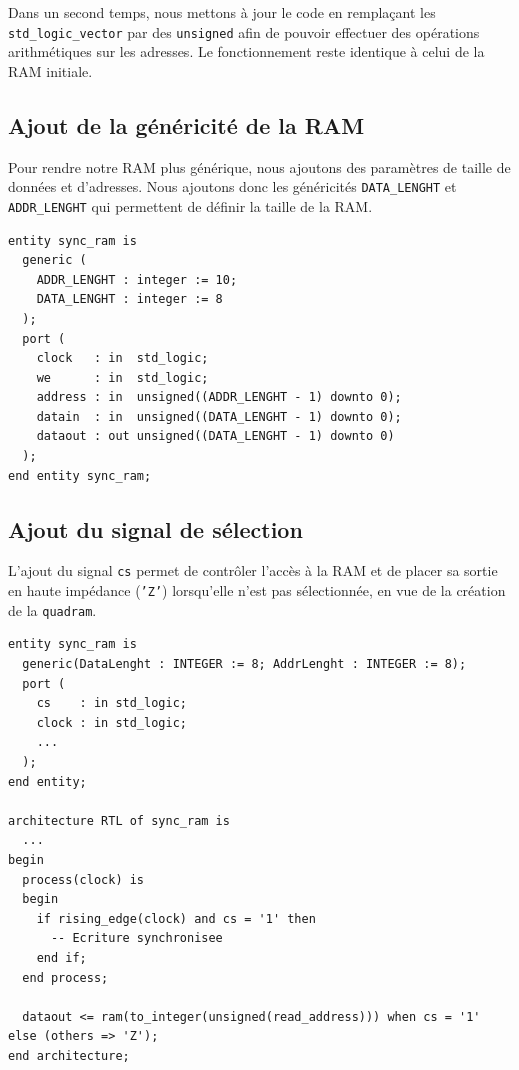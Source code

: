 Dans un second temps, nous mettons à jour le code en remplaçant les \texttt{std\_logic\_vector} par des \texttt{unsigned} 
afin de pouvoir effectuer des opérations arithmétiques sur les adresses. Le fonctionnement reste identique à celui de la RAM initiale.
\\

\subsection{Ajout de la généricité de la RAM}

Pour rendre notre RAM plus générique, nous ajoutons des paramètres de taille de données et d'adresses.
Nous ajoutons donc les généricités \texttt{DATA\_LENGHT} et \texttt{ADDR\_LENGHT} qui permettent de définir la taille de la RAM\@.

\begin{lstlisting}[caption={Nouvelle entité de la RAM}, label={lst:ram_entity}]
entity sync_ram is
  generic (
    ADDR_LENGHT : integer := 10;
    DATA_LENGHT : integer := 8
  );
  port (
    clock   : in  std_logic;
    we      : in  std_logic;
    address : in  unsigned((ADDR_LENGHT - 1) downto 0);
    datain  : in  unsigned((DATA_LENGHT - 1) downto 0);
    dataout : out unsigned((DATA_LENGHT - 1) downto 0)
  );
end entity sync_ram;
\end{lstlisting}

\subsection{Ajout du signal de sélection}

L'ajout du signal \texttt{cs} permet de contrôler l'accès à la RAM et de placer sa sortie en haute impédance (\texttt{'Z'}) lorsqu'elle n'est pas sélectionnée, en vue de la création de la \texttt{quadram}.

\begin{lstlisting}[caption={Ajout du signal cs}, label={lst:ram_entity_cs}]
entity sync_ram is
  generic(DataLenght : INTEGER := 8; AddrLenght : INTEGER := 8);
  port (
    cs    : in std_logic;
    clock : in std_logic;
    ...
  );
end entity;

architecture RTL of sync_ram is
  ...
begin
  process(clock) is
  begin
    if rising_edge(clock) and cs = '1' then
      -- Ecriture synchronisee
    end if;
  end process;

  dataout <= ram(to_integer(unsigned(read_address))) when cs = '1' else (others => 'Z');
end architecture;
\end{lstlisting}

